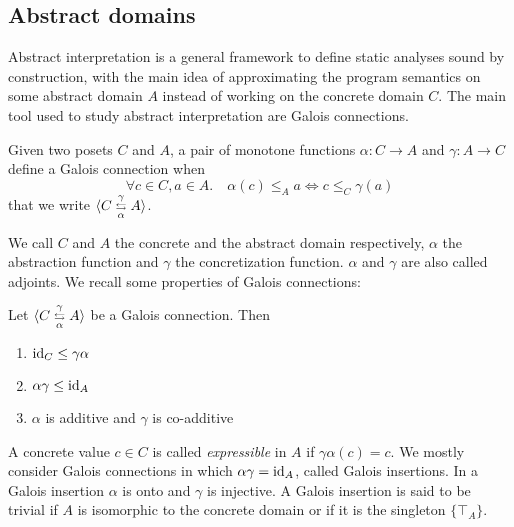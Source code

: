 \subsection{Abstract domains}
Abstract interpretation \cite{CC77,CC79} is a general framework to define static analyses sound by construction, with the main idea of approximating the program semantics on some abstract domain $A$ instead of working on the concrete domain $C$. The main tool used to study abstract interpretation are Galois connections.
\begin{definition}
	Given two posets $C$ and $A$, a pair of monotone functions $\alpha : C \rightarrow A$ and $\gamma : A \rightarrow C$ define a Galois connection when
	\[
	\forall c \in C, a \in A.\quad \alpha(c) \le_A a \iff c \le_C \gamma(a)
	\]
	that we write $\langle C \mathrel{\substack{\gamma \\ \leftrightarrows \\ \alpha}} A\rangle$.
\end{definition}
We call $C$ and $A$ the concrete and the abstract domain respectively, $\alpha$ the abstraction function and $\gamma$ the concretization function. $\alpha$ and $\gamma$ are also called adjoints.
We recall some properties of Galois connections:
\begin{prop}
	Let $\langle C \mathrel{\substack{\gamma \\ \leftrightarrows \\ \alpha}} A\rangle$ be a Galois connection. Then
	\begin{enumerate}
		\item $\text{id}_C \le \gamma \alpha$
		\item $\alpha \gamma \le \text{id}_A$
		\item $\alpha$ is additive and $\gamma$ is co-additive
	\end{enumerate}
\end{prop}
A concrete value $c \in C$ is called \emph{expressible} in $A$ if $\gamma \alpha(c) = c$.
We mostly consider Galois connections in which $\alpha \gamma = \text{id}_A$, called Galois insertions. In a Galois insertion $\alpha$ is onto and $\gamma$ is injective.
A Galois insertion is said to be trivial if $A$ is isomorphic to the concrete domain or if it is the singleton $\{ \top_A \}$.

